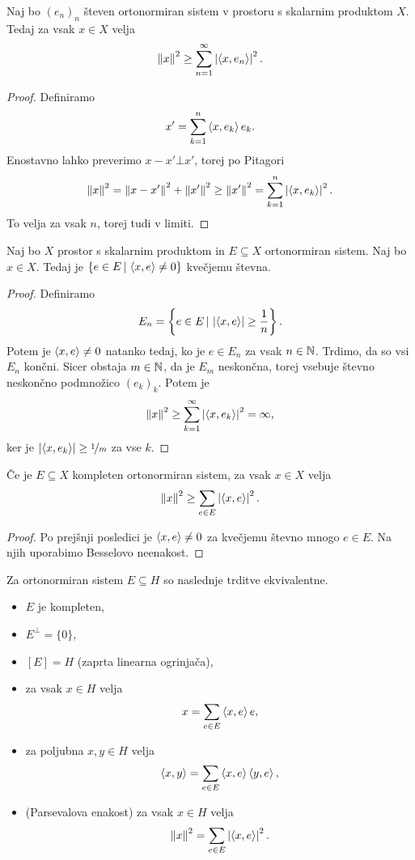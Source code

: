 \begin{trditev}
  Naj bo $(e_n)_n$ števen ortonormiran sistem v prostoru s skalarnim produktom
  $X$.
  Tedaj za vsak $x \in X$ velja
  \[
	\left\lVert x\right\rVert^2 \ge \sum_{n=1}^\infty \left| \left< x, e_n \right> \right|^2.
  \]
\end{trditev}

\begin{proof}
  Definiramo
  \[
	x' = \sum_{k=1}^n \left< x, e_k \right> e_k.
  \]
  Enostavno lahko preverimo $x - x' \bot x'$, torej po Pitagori
  \[
	\left\lVert x\right\rVert^2 = \left\lVert x - x'\right\rVert^2 + \left\lVert x'\right\rVert^2 \ge \left\lVert x'\right\rVert^2 = \sum_{k=1}^n
	\left| \left< x, e_k \right> \right|^2.
  \]
  To velja za vsak $n$, torej tudi v limiti.
\end{proof}

\begin{posledica}
  Naj bo $X$ prostor s skalarnim produktom in $E \subseteq X$ ortonormiran
  sistem.
  Naj bo $x \in X$.
  Tedaj je $\{e \in E \,|\, \left< x,e \right> \ne 0\}$ kvečjemu števna.
\end{posledica}

\begin{proof}
  Definiramo
  \[
	E_n = \left\{e \in E \,|\, \left| \left< x,e \right> \right| \ge \frac{1}{n}\right\}.
  \]
  Potem je $\left< x,e \right> \ne 0$ natanko tedaj, ko je $e \in E_n$ za vsak $n \in \mathbb{N}$.
  Trdimo, da so vsi $E_n$ končni.
  Sicer obstaja $m \in \mathbb{N}$, da je $E_m$ neskončna, torej vsebuje števno
  neskončno podmnožico $(e_k)_k$.
  Potem je
  \[
	\left\lVert x\right\rVert^2 \ge \sum_{k=1}^\infty \left| \left< x, e_k \right> \right|^2 = \infty,
  \]
  ker je $\left| \left< x,e_k \right> \right| \ge \nicefrac{1}{m}$ za vse $k$.
\end{proof}

\begin{posledica}
  Če je $E \subseteq X$ kompleten ortonormiran sistem, za vsak $x \in X$ velja
  \[
	\left\lVert x\right\rVert^2 \ge \sum_{e \in E} \left| \left< x, e \right> \right|^2.
  \]
\end{posledica}

\begin{proof}
  Po prejšnji posledici je $\left< x, e \right> \ne 0$ za kvečjemu števno mnogo $e \in E$.
  Na njih uporabimo Besselovo neenakost.
\end{proof}

\begin{izrek}
  Za ortonormiran sistem $E \subseteq H$ so naslednje trditve ekvivalentne.
  \begin{itemize}
  \item $E$ je kompleten,
  \item $E^\bot = \{0\}$,
  \item $[E] = H$ (zaprta linearna ogrinjača),
  \item za vsak $x \in H$ velja
	\[
	  x = \sum_{e \in E} \left< x,e \right> e,
	\]
  \item za poljubna $x, y \in H$ velja
	\[
	  \left< x,y \right> = \sum_{e \in E} \left< x,e \right> \left< y,e \right>,
	\]
  \item (Parsevalova enakost) za vsak $x \in H$ velja
	\[
	  \left\lVert x\right\rVert^2 = \sum_{e \in E} \left| \left< x, e \right> \right|^2.
	\]
  \end{itemize}
\end{izrek}

